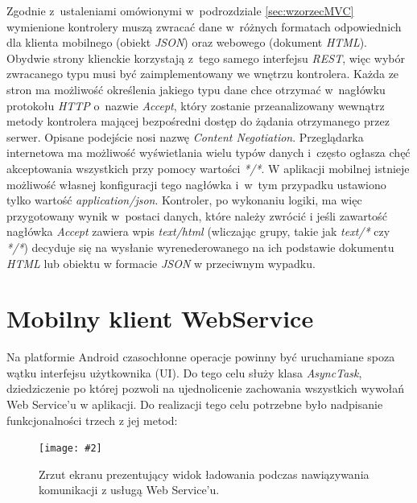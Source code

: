 \documentclass[11pt]{aghdpl}
\newcommand{\customWidthPicture}[3]{
\begin{figure}[h!]
	\centering
		\texttt{[image: \#2]}
	\caption{#3}
	\label{fig:#2}
\end{figure}
}
\begin{document}
Zgodnie z~ustaleniami omówionymi w~podrozdziale \ref{sec:wzorzecMVC} wymienione kontrolery muszą zwracać dane w~różnych formatach odpowiednich dla klienta mobilnego (obiekt \emph{JSON}) oraz webowego (dokument \emph{HTML}). Obydwie strony klienckie korzystają z~tego samego interfejsu \emph{REST}, więc wybór zwracanego typu musi być zaimplementowany we wnętrzu kontrolera. Każda ze stron ma możliwość określenia jakiego typu dane chce otrzymać w~nagłówku protokołu \emph{HTTP} o~nazwie \emph{Accept}, który zostanie przeanalizowany wewnątrz metody kontrolera mającej bezpośredni dostęp do żądania otrzymanego przez serwer. Opisane podejście nosi nazwę \emph{Content Negotiation}. Przeglądarka internetowa ma możliwość wyświetlania wielu typów danych i~często ogłasza chęć akceptowania wszystkich przy pomocy wartości \emph{*/*}. W aplikacji mobilnej istnieje możliwość własnej konfiguracji tego nagłówka i~w~tym przypadku ustawiono tylko wartość \emph{application/json}. Kontroler, po wykonaniu logiki, ma więc przygotowany wynik w~postaci danych, które należy zwrócić i jeśli zawartość nagłówka \emph{Accept} zawiera wpis \emph{text/html} (wliczając grupy, takie jak \emph{text/*} czy \emph{*/*}) decyduje się na wysłanie wyrenederowanego na ich podstawie dokumentu \emph{HTML} lub obiektu w formacie \emph{JSON} w przeciwnym wypadku.

\section{Mobilny klient WebService}

Na platformie Android czasochłonne operacje powinny być uruchamiane spoza wątku interfejsu użytkownika (UI). Do tego celu służy klasa \emph{AsyncTask}, dziedziczenie po której pozwoli na ujednolicenie zachowania wszystkich wywołań Web Service'u w aplikacji. Do realizacji tego celu potrzebne było nadpisanie funkcjonalności trzech z jej metod:

\customWidthPicture{.3}{mobileLadowanie}{Zrzut ekranu prezentujący widok ładowania podczas nawiązywania komunikacji z usługą Web Service'u.}
\end{document}
